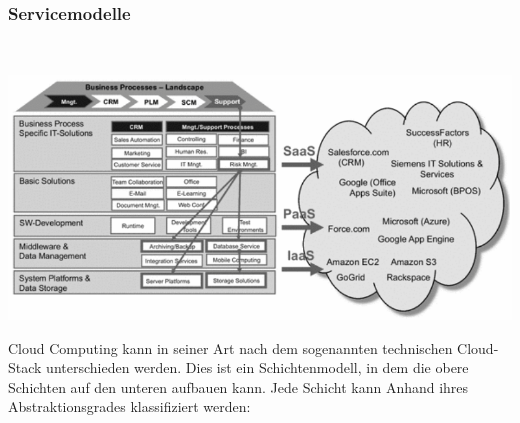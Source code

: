 \documentclass[13pt,a4paper,bibliography=totocnumbered,listof=totocnumbered]{scrartcl}
\begin{document}
\subsubsection{Servicemodelle}

\vspace{1em}
$\;$\\
\begin{minipage}{\linewidth}
	\centering
	\includegraphics[width=1.0\linewidth]{./img/IaaS_Modelle.png}
\end{minipage}
\vspace{1em}

Cloud Computing kann in seiner Art nach dem sogenannten technischen Cloud-Stack unterschieden werden. Dies ist ein Schichtenmodell, in dem die obere Schichten auf den unteren aufbauen kann. Jede Schicht kann Anhand ihres Abstraktionsgrades klassifiziert werden:
\end{document}
